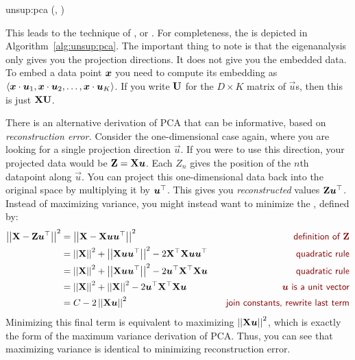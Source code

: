 \newalgorithm%
  {unsup:pca}%
  {(, )}
  {
}

This leads to the technique of , or .  For completeness, the is depicted in
Algorithm~\ref{alg:unsup:pca}.  The important thing to note is that
the eigenanalysis only gives you the projection directions.  It does
not give you the embedded data.  To embed a data point ${\boldsymbol{x}}$ you need
to compute its embedding as $\langle {\boldsymbol{x}} \cdot \boldsymbol{u}_1,
{\boldsymbol{x}} \cdot \boldsymbol{u}_2, \dots, {\boldsymbol{x}} \cdot \boldsymbol{u}_K \rangle$.  If you
write $\text{\bf U}$ for the $D \times K$ matrix of $\vec u$s, then this is
just $\text{\bf X} \text{\bf U}$.

There is an alternative derivation of PCA that can be informative,
based on \emph{reconstruction error.}  Consider the one-dimensional
case again, where you are looking for a single projection direction
$\vec u$.  If you were to use this direction, your projected data
would be $\text{\bf Z} = \text{\bf X} \boldsymbol{u}$.  Each $Z_n$ gives the position of
the $n$th datapoint along $\vec u$.  You can project this
one-dimensional data back into the original space by multiplying it by
$\boldsymbol{u}{}^\top$.  This gives you \emph{reconstructed} values $\text{\bf Z} \boldsymbol{u}{}^\top$.  Instead of maximizing variance, you might instead want to
minimize the , defined by:
%
\begin{align}
\norm{ \mat X - \mat Z\vec u\T}^2 
&= \norm{ \mat X - \mat X \vec u \vec u\T }^2 
\becauseof{definition of $\mat Z$}\\
&= \norm{\mat X}^2 
 + \norm{\mat X \vec u \vec u\T}^2
 - 2 \mat X\T \mat X \vec u \vec u\T
\becauseof{quadratic rule}\\
&= \norm{\mat X}^2 
 + \norm{\mat X \vec u \vec u\T}^2
 - 2 \vec u\T\mat X\T \mat X \vec u
\becauseof{quadratic rule}\\
&= \norm{\mat X}^2
 + \norm{\mat X}^2
 - 2 \vec u\T\mat X\T \mat X \vec u
\becauseof{$\vec u$ is a unit vector} \\
&= C - 2 \norm{\mat X \vec u}^2
\becauseof{join constants, rewrite last term}
\end{align}
%
Minimizing this final term is equivalent to maximizing $\left\vert\left\vert \text{\bf X}\boldsymbol{u} \right\vert\right\vert^2$, which is exactly the form of the maximum variance
derivation of PCA.  Thus, you can see that maximizing variance is
identical to minimizing reconstruction error.

